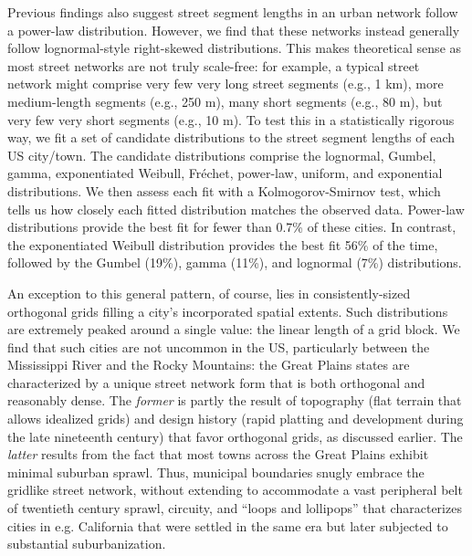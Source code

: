 \documentclass[Afour,sageh,times]{sagej}
\renewcommand{\cite}{\citep}
\begin{document}
Previous findings \citep[e.g.,][]{masucci_random_2009} also suggest street segment lengths in an urban network follow a power-law distribution. However, we find that these networks instead generally follow lognormal-style right-skewed distributions. This makes theoretical sense as most street networks are not truly scale-free: for example, a typical street network might comprise very few very long street segments (e.g., 1 km), more medium-length segments (e.g., 250 m), many short segments (e.g., 80 m), but very few very short segments (e.g., 10 m). To test this in a statistically rigorous way, we fit a set of candidate distributions to the street segment lengths of each US city/town. The candidate distributions comprise the lognormal, Gumbel, gamma, exponentiated Weibull, Fréchet, power-law, uniform, and exponential distributions. We then assess each fit with a Kolmogorov-Smirnov test, which tells us how closely each fitted distribution matches the observed data. Power-law distributions provide the best fit for fewer than 0.7\% of these cities. In contrast, the exponentiated Weibull distribution provides the best fit 56\% of the time, followed by the Gumbel (19\%), gamma (11\%), and lognormal (7\%) distributions.

An exception to this general pattern, of course, lies in consistently-sized orthogonal grids filling a city's incorporated spatial extents. Such distributions are extremely peaked around a single value: the linear length of a grid block. We find that such cities are not uncommon in the US, particularly between the Mississippi River and the Rocky Mountains: the Great Plains states are characterized by a unique street network form that is both orthogonal and reasonably dense. The \emph{former} is partly the result of topography (flat terrain that allows idealized grids) and design history (rapid platting and development during the late nineteenth century) that favor orthogonal grids, as discussed earlier. The \emph{latter} results from the fact that most towns across the Great Plains exhibit minimal suburban sprawl. Thus, municipal boundaries snugly embrace the gridlike street network, without extending to accommodate a vast peripheral belt of twentieth century sprawl, circuity, and \enquote{loops and lollipops} \cite{southworth_streets_1997} that characterizes cities in e.g. California that were settled in the same era but later subjected to substantial suburbanization.
\end{document}
